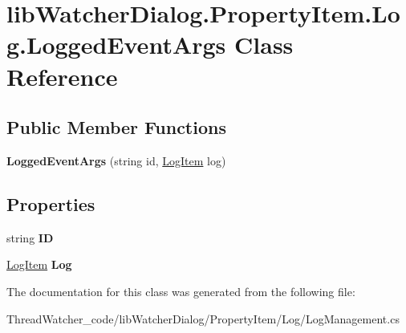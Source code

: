 \hypertarget{classlib_watcher_dialog_1_1_property_item_1_1_log_1_1_logged_event_args}{\section{lib\+Watcher\+Dialog.\+Property\+Item.\+Log.\+Logged\+Event\+Args Class Reference}
\label{classlib_watcher_dialog_1_1_property_item_1_1_log_1_1_logged_event_args}
}
\subsection*{Public Member Functions}
\begin{DoxyCompactItemize}
\item 
\hypertarget{classlib_watcher_dialog_1_1_property_item_1_1_log_1_1_logged_event_args_ae00139875e7a389e222ccf48412d4ca1}{{\bfseries Logged\+Event\+Args} (string id, \hyperlink{classlib_watcher_dialog_1_1_property_item_1_1_logger_1_1_log_item}{Log\+Item} log)}\label{classlib_watcher_dialog_1_1_property_item_1_1_log_1_1_logged_event_args_ae00139875e7a389e222ccf48412d4ca1}

\end{DoxyCompactItemize}
\subsection*{Properties}
\begin{DoxyCompactItemize}
\item 
\hypertarget{classlib_watcher_dialog_1_1_property_item_1_1_log_1_1_logged_event_args_a42a0e2c723bd9e69c772d197c35aa22b}{string {\bfseries I\+D}}\label{classlib_watcher_dialog_1_1_property_item_1_1_log_1_1_logged_event_args_a42a0e2c723bd9e69c772d197c35aa22b}

\item 
\hypertarget{classlib_watcher_dialog_1_1_property_item_1_1_log_1_1_logged_event_args_a5c190f9356fefa1f8b7f8d2eb62e527a}{\hyperlink{classlib_watcher_dialog_1_1_property_item_1_1_logger_1_1_log_item}{Log\+Item} {\bfseries Log}}\label{classlib_watcher_dialog_1_1_property_item_1_1_log_1_1_logged_event_args_a5c190f9356fefa1f8b7f8d2eb62e527a}

\end{DoxyCompactItemize}


The documentation for this class was generated from the following file\+:\begin{DoxyCompactItemize}
\item 
Thread\+Watcher\+\_\+code/lib\+Watcher\+Dialog/\+Property\+Item/\+Log/Log\+Management.\+cs\end{DoxyCompactItemize}
